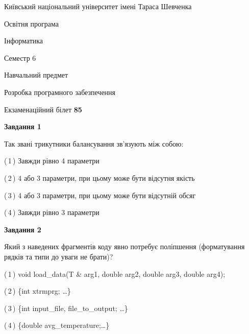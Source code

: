 \documentclass[10pt, ukrainian]{article}
\begin{document}
{{\begin {small}\par
{ \center  Київський національний університет імені Тараса Шевченка \par}
{\parbox {5 cm}{Освітня програма \hfill}{\parbox {7 cm}{Інформатика \hfill}}\parbox {6 cm}{\hfill Семестр 6}}\par
{\parbox {5 cm} {Навчальний предмет \hfill}\parbox {7 cm}{Розробка програмного забезпечення \hfill}\parbox {6cm}{\hfill}\par}\vspace{-7pt} \end{small}}{\center Екзаменаційний білет \No \textbf
{ 85 }\par}}
{
\begin {large}
{\begin {center}\textbf{Завдання 1}\end {center}}\par
Так звані трикутники балансування зв'язують між собою:\par
\vspace{2mm}



(\,1\,) Завжди рівно 4 параметри%



(\,2\,) 4 або 3 параметри, при цьому може бути відсутня якість%



(\,3\,) 4 або 3 параметри, при цьому може бути відсутній обсяг %



(\,4\,) Завжди рівно 3 параметри%


{\begin {center}\textbf{Завдання 2}\end {center}}\par
Який з наведених фрагментів коду явно потребує поліпшення (форматування рядків та типи до уваги не брати)?\par
\vspace{2mm}



(\,1\,) void load\_data(T \& arg1, double arg2, double arg3, double arg4); %



(\,2\,) \{int xtrmprg; …\}%



(\,3\,) \{int input\_file, file\_to\_output; …\}%



(\,4\,) \{double avg\_temperature;…\} %



\end{large}}
\end{document}

